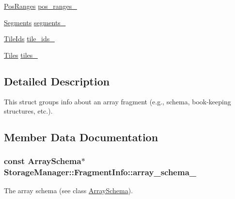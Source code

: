 \begin{DoxyCompactItemize}
\item 
\hyperlink{classStorageManager_a118ac28e229231431d92b9993c28559d}{Pos\+Ranges} \hyperlink{structStorageManager_1_1FragmentInfo_a62cdc24ff855fca25e44149ac06f1750}{pos\+\_\+ranges\+\_\+}
\item 
\hyperlink{classStorageManager_ac40d6aec2ad9e7e4ecc7c765628dccb1}{Segments} \hyperlink{structStorageManager_1_1FragmentInfo_a218cabe8c985b3d51a71b1a09946f766}{segments\+\_\+}
\item 
\hyperlink{classStorageManager_a201ad7c940545c292d5b1d28c628e848}{Tile\+Ids} \hyperlink{structStorageManager_1_1FragmentInfo_ab777a66655150bbdcd6b3b86cc747b92}{tile\+\_\+ids\+\_\+}
\item 
\hyperlink{classStorageManager_a2eb2f058a32a6279eaa277bcacdc663f}{Tiles} \hyperlink{structStorageManager_1_1FragmentInfo_afc7f64387b6a937071865b891dc951ca}{tiles\+\_\+}
\end{DoxyCompactItemize}


\subsection{Detailed Description}
This struct groups info about an array fragment (e.\+g., schema, book-\/keeping structures, etc.). 

\subsection{Member Data Documentation}
\hypertarget{structStorageManager_1_1FragmentInfo_ac2b6b9541f3333e4c3531249b011fa18}{}
\subsubsection[{array\+\_\+schema\+\_\+}]{\setlength{\rightskip}{0pt plus 5cm}const {\bf Array\+Schema}$\ast$ Storage\+Manager\+::\+Fragment\+Info\+::array\+\_\+schema\+\_\+}\label{structStorageManager_1_1FragmentInfo_ac2b6b9541f3333e4c3531249b011fa18}
The array schema (see class \hyperlink{classArraySchema}{Array\+Schema}). \hypertarget{structStorageManager_1_1FragmentInfo_aac30cfa70d7b2abf6dcfcc99e8a36403}{}
